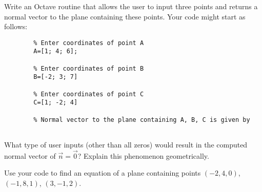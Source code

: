 \documentclass{ximera}
\begin{document}
\begin{problem}\label{prob_oct_vec_4}
    Write an Octave routine that allows the user to input three points and returns a normal vector to the plane containing these points.  Your code might start as follows:

    \begin{verbatim}
        % Enter coordinates of point A
        A=[1; 4; 6];
        
        % Enter coordinates of point B
        B=[-2; 3; 7]
        
        % Enter coordinates of point C
        C=[1; -2; 4]
        
        % Normal vector to the plane containing A, B, C is given by
        
    \end{verbatim}

    What type of user inputs (other than all zeros) would result in the computed normal vector of $\vec{n}=\vec{0}$?  Explain this phenomenon geometrically.

    Use your code to find an equation of a plane containing points $(-2, 4, 0)$, $(-1, 8, 1)$, $(3, -1, 2)$.
\end{problem}    
\end{document}
